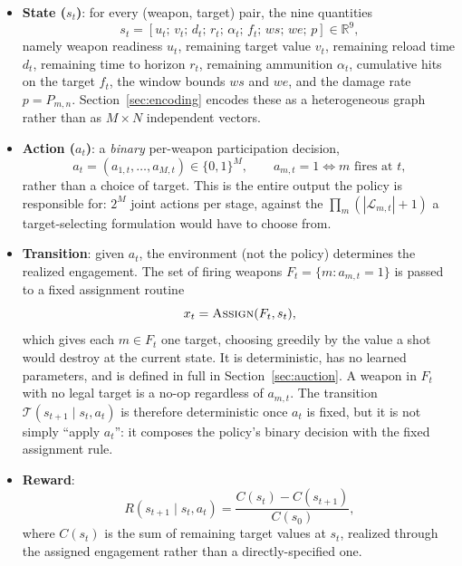 \begin{itemize}
\item \textbf{State ($s_t$)}: for every (weapon, target) pair, the
nine quantities
\begin{equation}
\label{eq:state}
s_t = [u_t;\, v_t;\, d_t;\, r_t;\, \alpha_t;\, f_t;\, ws;\, we;\, p] \in \mathbb{R}^9,
\end{equation}
namely weapon readiness $u_t$, remaining target value $v_t$, remaining reload
time $d_t$, remaining time to horizon $r_t$, remaining ammunition $\alpha_t$,
cumulative hits on the target $f_t$, the window bounds $ws$ and $we$, and the
damage rate $p = P_{m,n}$. Section~\ref{sec:encoding} encodes these as a
heterogeneous graph rather than as $M \times N$ independent vectors.

\item \textbf{Action ($a_t$)}: a \emph{binary} per-weapon participation
decision,
\begin{equation}
\label{eq:binary-action}
a_t = (a_{1,t}, \ldots, a_{M,t}) \in \{0,1\}^M, \qquad a_{m,t} = 1 \iff m \text{ fires at } t,
\end{equation}
rather than a choice of target. This is the entire output the policy is
responsible for: $2^M$ joint actions per stage, against the
$\prod_m (|\mathcal{L}_{m,t}|+1)$ a target-selecting formulation would have to choose from.

\item \textbf{Transition}: given $a_t$, the environment (not the policy)
determines the realized engagement. The set of firing weapons
$F_t = \{m : a_{m,t}=1\}$ is passed to a fixed assignment routine
\begin{equation}
\label{eq:auction-call}
x_t = \textsc{Assign}(F_t, s_t),
\end{equation}
which gives each $m \in F_t$ one target, choosing greedily by the value a
shot would destroy at the current state. It is deterministic, has no learned
parameters, and is defined in full in Section~\ref{sec:auction}. A weapon in
$F_t$ with no legal target is a no-op regardless of $a_{m,t}$. The transition
$\mathcal{T}(s_{t+1} \mid s_t, a_t)$ is therefore deterministic once $a_t$
is fixed, but it is not simply ``apply $a_t$'': it composes the policy's
binary decision with the fixed assignment rule.

\item \textbf{Reward}:
\begin{equation}
R(s_{t+1} \mid s_t, a_t) = \frac{C(s_t) - C(s_{t+1})}{C(s_0)},
\end{equation}
where $C(s_t)$ is the sum of remaining target values at $s_t$, realized
through the assigned engagement rather than a directly-specified one.
\end{itemize}


